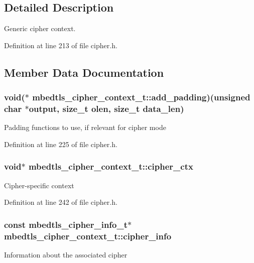 \subsection{Detailed Description}
Generic cipher context. 

Definition at line 213 of file cipher.\-h.



\subsection{Member Data Documentation}
\hypertarget{structmbedtls__cipher__context__t_a74bf13046088d8a575d0920f20178a8a}{
\subsubsection[{add\-\_\-padding}]{\setlength{\rightskip}{0pt plus 5cm}void($\ast$ mbedtls\-\_\-cipher\-\_\-context\-\_\-t\-::add\-\_\-padding)(unsigned char $\ast$output, size\-\_\-t olen, size\-\_\-t data\-\_\-len)}}\label{structmbedtls__cipher__context__t_a74bf13046088d8a575d0920f20178a8a}
Padding functions to use, if relevant for cipher mode 

Definition at line 225 of file cipher.\-h.

\hypertarget{structmbedtls__cipher__context__t_a5b7e2044b5186a4ee57456f6f927ad80}{
\subsubsection[{cipher\-\_\-ctx}]{\setlength{\rightskip}{0pt plus 5cm}void$\ast$ mbedtls\-\_\-cipher\-\_\-context\-\_\-t\-::cipher\-\_\-ctx}}\label{structmbedtls__cipher__context__t_a5b7e2044b5186a4ee57456f6f927ad80}
Cipher-\/specific context 

Definition at line 242 of file cipher.\-h.

\hypertarget{structmbedtls__cipher__context__t_a7673da39ff63a88c9b85769048884dae}{
\subsubsection[{cipher\-\_\-info}]{\setlength{\rightskip}{0pt plus 5cm}const {\bf mbedtls\-\_\-cipher\-\_\-info\-\_\-t}$\ast$ mbedtls\-\_\-cipher\-\_\-context\-\_\-t\-::cipher\-\_\-info}}\label{structmbedtls__cipher__context__t_a7673da39ff63a88c9b85769048884dae}
Information about the associated cipher 

